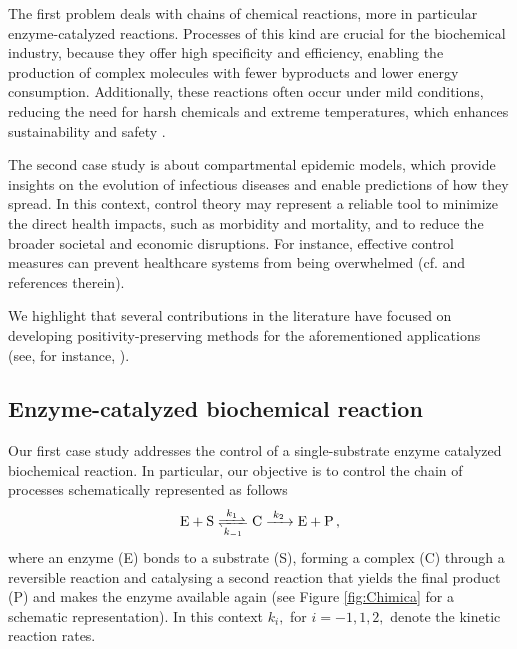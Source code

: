 \documentclass[10pt]{article}
\theoremstyle{remark}
\theoremstyle{definition}
\theoremstyle{remark}
\begin{document}
The first problem deals with chains of chemical reactions, more in particular enzyme-catalyzed reactions. Processes of this kind are crucial for the biochemical industry, because they offer high specificity and efficiency, enabling the production of complex molecules with fewer byproducts and lower energy consumption. Additionally, these reactions often occur under mild conditions, reducing the need for harsh chemicals and extreme temperatures, which enhances sustainability and safety \cite{biochem,SR18,WALSH20101}.

The second case study is about compartmental epidemic models, which provide insights on the evolution of infectious diseases and enable predictions of how they spread. In this context, control theory may represent a reliable tool to minimize the direct health impacts, such as morbidity and mortality, and to reduce the broader societal and economic disruptions. For instance, effective control measures can prevent healthcare systems from being overwhelmed (cf.  \cite{BUONOMO2014,Bolzoni2021,BOLZONI2019,Cacace_Oliviero} and references therein).

We highlight that several contributions in the literature have focused on developing positivity-preserving methods for the aforementioned applications (see, for instance, \cite{Blanes,TAKACS2024,MPV_Axioms,MPV_Mixing,Zhang2024-br,Zafar,MPVNSFD,Lubuma_Chem,Mario_Pezzella}).

\subsection{Enzyme-catalyzed biochemical reaction}

Our first case study addresses  the control of a single-substrate enzyme catalyzed biochemical reaction.
In particular, our objective is to control the chain of processes schematically represented as follows
\begin{equation*}
\ce{E + S  <=>[$k_1$][$k_{-1}$]  C  ->[$k_2$]  E + P ,}
\end{equation*}
where an enzyme (E) bonds to a substrate (S), forming a complex (C) through a reversible reaction and catalysing a second reaction that yields the final product (P) and makes the enzyme available again (see Figure \ref{fig:Chimica} for a schematic representation). In this context $k_i,$ for $i=-1,1,2,$ denote the kinetic reaction rates.
\end{document}
